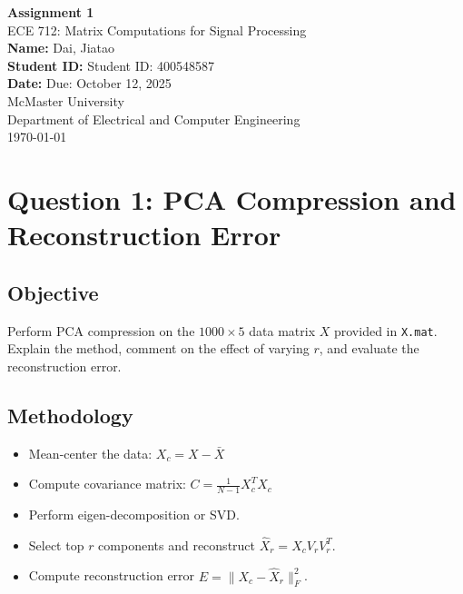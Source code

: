 \documentclass[12pt,a4paper]{article}
\newcommand{\coursename}{ECE 712: Matrix Computations for Signal Processing}
\newcommand{\assignmenttitle}{Assignment 1}
\newcommand{\studentname}{Dai, Jiatao}
\newcommand{\studentid}{Student ID: 400548587}
\newcommand{\duedate}{Due: October 12, 2025}
\begin{document}
\begin{titlepage}
    \centering
    \vspace*{2cm}
    {\Huge \textbf{\assignmenttitle}}\\[1.5cm]
    {\Large \coursename}\\[1cm]
    \vspace{1cm}
    \textbf{Name:} \studentname \\[0.3cm]
    \textbf{Student ID:} \studentid \\[0.3cm]
    \textbf{Date:} \duedate \\[2cm]

    \vfill
    {\Large McMaster University \\[0.3cm]
    Department of Electrical and Computer Engineering \\[0.3cm]
    \today}
\end{titlepage}

\tableofcontents
\newpage

\section{Question 1: PCA Compression and Reconstruction Error}

\subsection{Objective}
Perform PCA compression on the $1000\times5$ data matrix $X$ provided in \texttt{X.mat}.  
Explain the method, comment on the effect of varying $r$, and evaluate the reconstruction error.

\subsection{Methodology}
\begin{itemize}
    \item Mean-center the data: \( X_c = X - \bar{X} \)
    \item Compute covariance matrix: \( C = \frac{1}{N-1} X_c^T X_c \)
    \item Perform eigen-decomposition or SVD.
    \item Select top $r$ components and reconstruct \( \hat{X}_r = X_c V_r V_r^T \).
    \item Compute reconstruction error \( E = \|X_c - \hat{X}_r\|_F^2 \).
\end{itemize}
\end{document}
